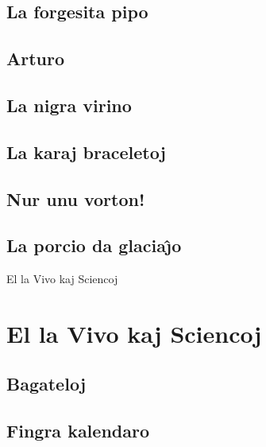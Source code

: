 \documentclass[a5paper,11pt,openany,twoside]{book}
\begin{document}
\section{La forgesita pipo}
\label{pipo}


\section{Arturo}
\label{arturo}


\newpage %

\section{La nigra virino}
\label{nigra}


\section{La karaj braceletoj}
\label{braceletoj}


\section{Nur unu vorton!}
\label{unuvorton}


\section{La porcio da glacia\^{\j}o}
\label{porcio}



 El la Vivo kaj Sciencoj

\chapter{El la Vivo kaj Sciencoj}
\section{Bagateloj}
\label{bagateloj}


\section{Fingra kalendaro}
\label{fingra}

\end{document}
